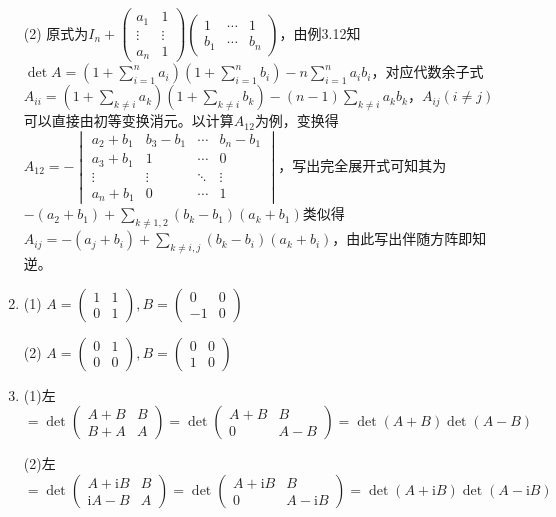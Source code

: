 \documentclass[a4paper,UTF8,fontset=windows]{ctexart}
\begin{document}
\begin{enumerate}
(2) 原式为$I_n+\begin{pmatrix}a_1&1\\\vdots&\vdots\\a_n&1\end{pmatrix}\begin{pmatrix}1&\cdots&1\\b_1&\cdots&b_n\end{pmatrix}$，由例3.12知$\det A =\left(1+\sum_{i=1}^{n}a_i\right)\left(1+\sum_{i=1}^{n}b_i\right)-n\sum_{i=1}^{n}a_ib_i$，对应代数余子式$A_{ii}=\left(1+\sum_{k\ne i} a_k\right)\left(1+\sum_{k\ne i} b_k\right)-(n-1)\sum_{k\ne i} a_kb_k$，$A_{ij}\left(i\ne j\right)$可以直接由初等变换消元。以计算$A_{12}$为例，变换得$A_{12}=-\begin{vmatrix}a_2+b_1&b_3-b_1&\cdots&b_n-b_1\\a_3+b_1&1&\cdots&0\\\vdots&\vdots&\ddots&\vdots\\a_n+b_1&0&\cdots&1\end{vmatrix}$，写出完全展开式可知其为$-(a_2+b_1)+\sum_{k\ne1,2}(b_k-b_1)(a_k+b_1)$类似得$A_{ij}=-(a_j+b_i)+\sum_{k\ne i,j}(b_k-b_i)(a_k+b_i)$，由此写出伴随方阵即知逆。

\item
(1) $A=\begin{pmatrix}1&1\\0&1\end{pmatrix},B=\begin{pmatrix}0&0\\-1&0\end{pmatrix}$

(2) $A=\begin{pmatrix}0&1\\0&0\end{pmatrix},B=\begin{pmatrix}0&0\\1&0\end{pmatrix}$

\item
(1)左$=\det{\begin{pmatrix}A+B&B\\B+A&A\end{pmatrix}}=\det{\begin{pmatrix}A+B&B\\0&A-B\end{pmatrix}}=\det(A+B)\det(A-B)$

(2)左$=\det{\begin{pmatrix}A+\mathrm{i}B&B\\\mathrm{i}A-B&A\end{pmatrix}}=\det{\begin{pmatrix}A+\mathrm{i}B&B\\0&A-\mathrm{i}B\end{pmatrix}}=\det(A+\mathrm{i}B)\det(A-\mathrm{i}B)$


\end{enumerate}
\end{document}
